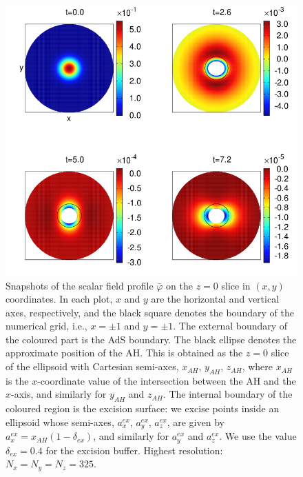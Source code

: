 \documentclass[aps,letterpaper,twocolumn,nofootinbib]{revtex4}
\numberwithin{equation}{section}
\begin{document}
\begin{figure}[t!]
        \centering
        \includegraphics[width=5.2in,clip=true]{phi1_L3_snapshots_2by2.png}
\parbox{5.0in}{\caption{Snapshots of the scalar field profile $\bar{\varphi}$ on the $z=0$ slice in $(x,y)$ coordinates. In each plot, $x$ and $y$ are the horizontal and vertical axes, respectively, and the black square denotes the boundary of the numerical grid, i.e., $x=\pm 1$ and $y=\pm 1$. The external boundary of the coloured part is the AdS boundary. The black ellipse denotes the approximate position of the AH. This is obtained as the $z=0$ slice of the ellipsoid with Cartesian semi-axes, $x_{AH}$, $y_{AH}$, $z_{AH}$, where $x_{AH}$ is the $x$-coordinate value of the intersection between the AH and the $x$-axis, and similarly for $y_{AH}$ and $z_{AH}$.
The internal boundary of the coloured region is the excision surface: we excise points inside an ellipsoid whose semi-axes, $a_x^{ex}$, $a_y^{ex}$, $a_z^{ex}$, are given by $a_x^{ex}=x_{AH}(1-\delta_{ex})$, and similarly for $a_y^{ex}$ and $a_z^{ex}$. We use the value $\delta_{ex}=0.4$ for the excision buffer. Highest resolution: $N_x=N_y=N_z=325$.
        }\label{fig:snapshotsscalarfield}}
\end{figure}
\end{document}

